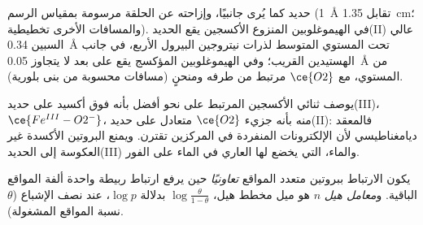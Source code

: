 \begin{omfigure}

{\small حديد  كما يُرى جانبيًا، وإزاحته عن الحلقة مرسومة بمقياس
الرسم (1~\AA{} تقابل 1.35~cm؛ والمسافات الأخرى تخطيطية). في الهيموغلوبين المنزوع الأكسجين يقع الحديد(II) عالي السبين
\qty{0.34}{\angstrom} تحت المستوي المتوسط لذرات نيتروجين البيرول الأربع، في جانب
الهستيدين القريب؛ وفي الهيموغلوبين المؤكسج يقع على بعد لا يتجاوز \qty{0.05}{\angstrom} من المستوي، مع $\ce{O2}$
مرتبط من طرفه ومنحنٍ (مسافات محسوبة من بنى بلورية).}
\end{omfigure}

يوصف ثنائي الأكسجين المرتبط على نحو أفضل بأنه فوق أكسيد على حديد(III)، $\ce{Fe^{III}-O2^-}$، منه بأنه
جزيء $\ce{O2}$ متعادل على حديد(II): فالمعقد ديامغناطيسي لأن الإلكترونات
المنفردة في المركزين تقترن. ويمنع البروتين الأكسدة غير العكوسة
إلى الحديد(III) والماء، التي يخضع لها  العاري في الماء على
الفور.

\begin{definition}\label{def:b3:bioinorganic:cooperativity}
يكون الارتباط ببروتين متعدد المواقع \emph{تعاونيًا}
حين يرفع ارتباط ربيطة واحدة ألفة المواقع
الباقية. و\emph{معامل هيل} $n$ هو ميل
مخطط هيل، $\log\frac{\theta}{1 - \theta}$ بدلالة $\log p$، عند نصف الإشباع ($\theta$ نسبة المواقع
المشغولة).
\end{definition}

